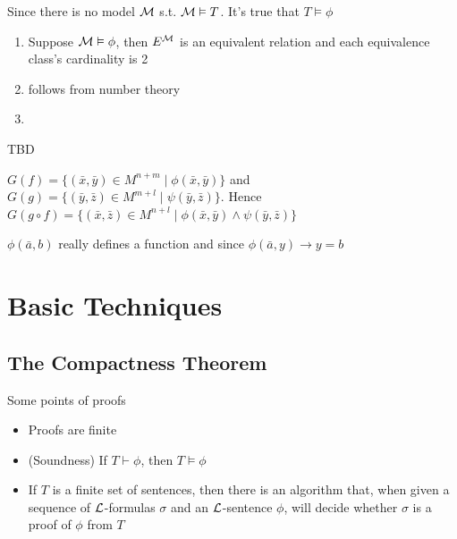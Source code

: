 \documentclass[11pt]{article}
\begin{document}
\begin{exercise}
Since there is no model \(\mathcal{M}\) s.t. \(\mathcal{M}\vDash T\). It's true that 
\(T\vDash \phi\)
\end{exercise}

\begin{exercise}
\begin{enumerate}
\item Suppose \(\mathcal{M}\vDash\phi\), then \(E^{\mathcal{M}}\) is an equivalent relation and
each equivalence class's cardinality is 2
\item follows from number theory
\item \cite{DBLP:journals/bsl/DurandJMM12}
\end{enumerate}
\end{exercise}

\begin{exercise}
TBD
\end{exercise}

\begin{exercise}
\(G(f)=\{(\bar{x},\bar{y})\in M^{n+m}\mid\phi(\bar{x},\bar{y})\}\) and 
\(G(g)=\{(\bar{y},\bar{z})\in M^{m+l}\mid\psi(\bar{y},\bar{z})\}\). Hence
\(G(g\circ f)=\{(\bar{x},\bar{z})\in M^{n+l}\mid \phi(\bar{x},\bar{y})
   \wedge \psi(\bar{y},\bar{z})\}\)
\end{exercise}

\begin{exercise}
\(\phi(\bar{a},b)\) really defines a function and since 
\(\phi(\bar{a},y)\to y=b\)
\end{exercise}

\section{Basic Techniques}
\label{sec:org1a56ebc}
\subsection{The Compactness Theorem}
\label{sec:orgb5c4b3e}

Some points of proofs
\begin{itemize}
\item Proofs are finite
\item (Soundness) If \(T\vdash\phi\), then \(T\vDash\phi\)
\item If \(T\) is a finite set of sentences, then there is an algorithm that,
when given a sequence of \(\mathcal{L}\)-formulas \(\sigma\) and an \(\mathcal{L}\)-sentence \(\phi\),
will decide whether \(\sigma\) is a proof of \(\phi\) from \(T\)
\end{itemize}
\end{document}
